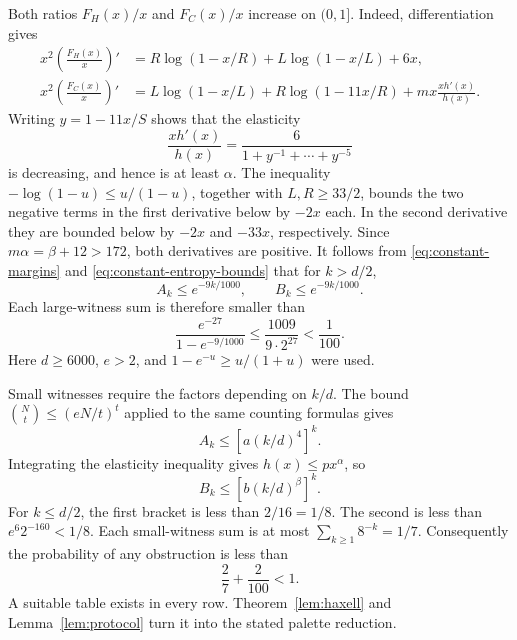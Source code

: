 \documentclass[11pt]{article}
\theoremstyle{definition}
\theoremstyle{remark}
\begin{document}
Both ratios $F_H(x)/x$ and $F_C(x)/x$ increase on $(0,1]$.
Indeed, differentiation gives
\begin{align*}
 x^2\left(\frac{F_H(x)}x\right)'
 &=R\log(1-x/R)+L\log(1-x/L)+6x,\\
 x^2\left(\frac{F_C(x)}x\right)'
 &=L\log(1-x/L)+R\log(1-11x/R)
   +mx\frac{xh'(x)}{h(x)}.
\end{align*}
Writing $y=1-11x/S$ shows that the elasticity
\[
 \frac{xh'(x)}{h(x)}
 =\frac{6}{1+y^{-1}+\cdots+y^{-5}}
\]
is decreasing, and hence is at least $\alpha$.
The inequality $-\log(1-u)\le u/(1-u)$, together with
$L,R\ge33/2$, bounds the two negative terms in the first derivative
below by $-2x$ each.  In the second derivative they are bounded below
by $-2x$ and $-33x$, respectively.  Since
$m\alpha=\beta+12>172$, both derivatives are positive.
It follows from \eqref{eq:constant-margins} and
\eqref{eq:constant-entropy-bounds} that for $k>d/2$,
\[
 A_k\le e^{-9k/1000},\qquad B_k\le e^{-9k/1000}.
\]
Each large-witness sum is therefore smaller than
\[
 \frac{e^{-27}}{1-e^{-9/1000}}
 \le\frac{1009}{9\cdot2^{27}}<\frac1{100}.
\]
Here $d\ge6000$, $e>2$, and
$1-e^{-u}\ge u/(1+u)$ were used.

Small witnesses require the factors depending on $k/d$.  The bound
$\binom Nt\le(eN/t)^t$ applied to the same counting formulas gives
\[
 A_k\le\left[a(k/d)^4\right]^k.
\]
Integrating the elasticity inequality gives $h(x)\le px^\alpha$, so
\[
 B_k\le\left[b(k/d)^\beta\right]^k.
\]
For $k\le d/2$, the first bracket is less than $2/16=1/8$.
The second is less than $e^6 2^{-160}<1/8$.
Each small-witness sum is at most $\sum_{k\ge1}8^{-k}=1/7$.
Consequently the probability of any obstruction is less than
\[
 \frac27+\frac2{100}<1.
\]
A suitable table exists in every row.  Theorem~\ref{lem:haxell} and
Lemma~\ref{lem:protocol} turn it into the stated palette reduction.
\end{document}
